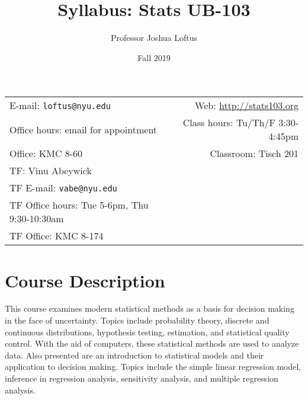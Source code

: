 \documentclass[11pt]{article}
\title{Syllabus: Stats UB-103}
\author{Professor Joshua Loftus}
\date{Fall 2019}
\newcommand{\blankline}{\quad\pagebreak[2]}
\begin{document}
\maketitle

\blankline

\begin{tabular*}{.93\textwidth}{@{\extracolsep{\fill}}lr}


E-mail: \texttt{loftus@nyu.edu} & Web: \url{http://stats103.org}  \\

 Office hours: email for appointment  &  Class hours: Tu/Th/F 3:30-4:45pm \\

 Office: KMC 8-60 & Classroom: Tisch 201 \\
TF: Vinu Abeywick \\
TF E-mail: \texttt{vabe@nyu.edu} & \\
TF Office hours: Tue 5-6pm, Thu 9:30-10:30am &  \\
TF Office: KMC 8-174 \\
\hline
\end{tabular*}

\vspace{5 mm}


\section*{Course Description}

This course examines modern statistical methods as a basis for decision making in the face of uncertainty. Topics include probability theory, discrete and continuous distributions, hypothesis testing, estimation, and statistical quality control. With the aid of computers, these statistical methods are used to analyze data. Also presented are an introduction to statistical models and their application to decision making. Topics include the simple linear regression model, inference in regression analysis, sensitivity analysis, and multiple regression analysis.

\end{document}
